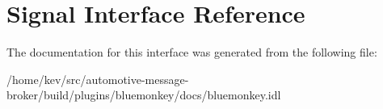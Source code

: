 \hypertarget{interfaceSignal}{\section{Signal Interface Reference}
\label{interfaceSignal}
}


The documentation for this interface was generated from the following file\+:\begin{DoxyCompactItemize}
\item 
/home/kev/src/automotive-\/message-\/broker/build/plugins/bluemonkey/docs/bluemonkey.\+idl\end{DoxyCompactItemize}
